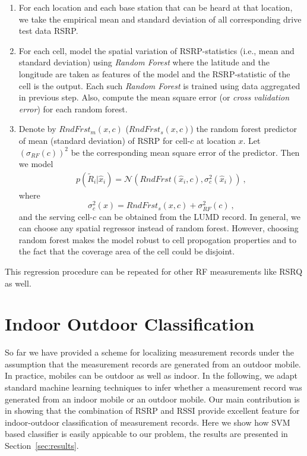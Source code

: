 \documentclass[conference, 10pt]{IEEEtran}
\begin{document}
\begin{enumerate}

\item For each location and each base station that can be heard at that location, we
take the empirical mean and standard deviation of all corresponding drive test data
RSRP. 

\item For each cell, model the spatial variation of RSRP-statistics (i.e., mean and
standard deviation) using {\em Random Forest} where the latitude and the longitude are 
taken as features of the model and the RSRP-statistic  of the cell is the output. Each such {\em
Random Forest} is trained using data aggregated in previous step. Also,
compute the mean square error (or {\em cross validation error})
for each random forest.

\item Denote by $RndFrst_m(x,c)$ ($RndFrst_s(x,c)$) the random forest predictor of
mean (standard deviation) of RSRP for cell-$c$
at location $x$. Let $(\sigma_{RF}(c))^2$ be the corresponding
mean square error of the predictor. Then we model
\begin{align}
p(\tilde{R}_i|\hat{x}_{i}) =
\mathcal{N}(RndFrst(\hat{x}_{i},c), \sigma_c^2(\hat{x}_i))\ ,
\end{align}
where $$\sigma_c^2(x) = RndFrst_s(x,c) + \sigma_{RF}^2(c)\ ,$$ 
and the serving cell-$c$ can be obtained from the LUMD record. In general, we
can choose any spatial regressor instead of random forest. However, choosing
random forest makes the model robust to cell propogation properties and to the
fact that the coverage area of the cell could be disjoint.

\end{enumerate}

This regression procedure can be repeated for other RF measurements like RSRQ as
well.


\section{Indoor Outdoor Classification}
\label{sec:class}


So far we have provided a scheme for localizing measurement records under the
assumption that the measurement records are generated from an outdoor mobile. In
practice, mobiles can be outdoor as well as indoor. In the following, we adapt
standard machine learning techniques to infer whether a measurement record was
generated from an indoor mobile or an outdoor mobile. Our main contribution is in
showing that the combination of RSRP and RSSI provide excellent feature for
indoor-outdoor classification of measurement records. Here we show how SVM based
classifier is easily appicable to our problem, the results are presented in
Section~\ref{sec:results}.
\end{document}
